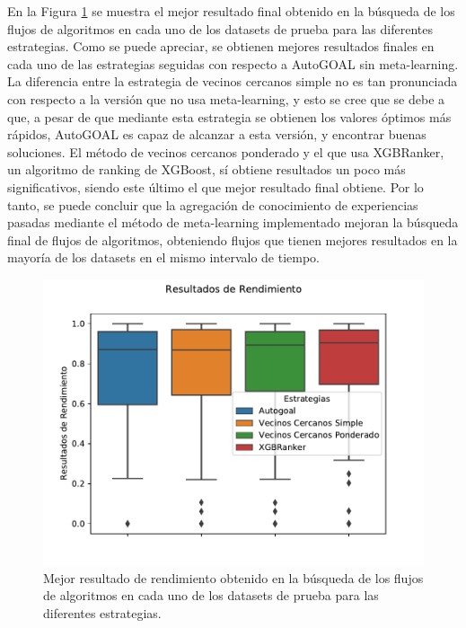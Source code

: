 En la Figura \ref{fig:bestfn} se muestra el mejor resultado final obtenido en la búsqueda de los flujos de algoritmos en cada uno de los datasets de prueba para las diferentes estrategias. Como se puede apreciar, se obtienen mejores resultados finales en cada uno de las estrategias seguidas con respecto a AutoGOAL sin meta-learning. La diferencia entre la estrategia de vecinos cercanos simple no es tan pronunciada con respecto a  la versión que no usa meta-learning, y esto se cree que se debe a que, a pesar de que mediante esta estrategia se obtienen los valores óptimos más rápidos, AutoGOAL es capaz de alcanzar a esta versión, y encontrar buenas soluciones. El método de vecinos cercanos ponderado y el que usa XGBRanker, un algoritmo de ranking de XGBoost, sí obtiene resultados un poco más significativos, siendo este último el que mejor resultado final obtiene. Por lo tanto, se puede concluir que la agregación de conocimiento de experiencias pasadas mediante el método de meta-learning implementado mejoran la búsqueda final de flujos de algoritmos, obteniendo flujos que tienen mejores resultados en la mayoría de los datasets en el mismo intervalo de tiempo.

\begin{figure}[H]
\centering
\includegraphics[scale=.8]{Figures/best-fn.pdf}
\caption{Mejor resultado de rendimiento obtenido en la búsqueda de los flujos de algoritmos en cada uno de los datasets de prueba para las diferentes estrategias.}
\label{fig:bestfn}
\end{figure}

